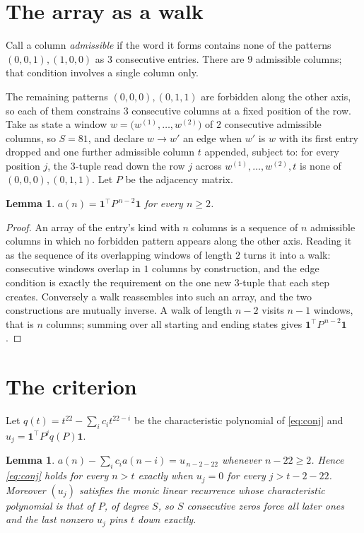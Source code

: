 \documentclass[11pt,a4paper]{article}
\theoremstyle{plain}
\newtheorem{lemma}[theorem]{Lemma}
\theoremstyle{definition}
\begin{document}
\section{The array as a walk}

Call a column \emph{admissible} if the word it forms contains none of the patterns
$(0,0,1), (1,0,0)$ as $3$ consecutive entries. There are $9$ admissible columns; that condition
involves a single column only.

The remaining patterns $(0,0,0), (0,1,1)$ are forbidden along the other axis, so each of them
constrains $3$ consecutive columns at a fixed position of the row. Take as state a
window $w=\bigl(w^{(1)},\dots,w^{(2)}\bigr)$ of $2$ consecutive admissible
columns, so $S=81$, and declare $w\to w'$ an edge when $w'$ is $w$ with its first entry
dropped and one further admissible column $t$ appended, subject to: for every position
$j$, the $3$-tuple read down the row $j$ across $w^{(1)},\dots,w^{(2)},t$
is none of $(0,0,0), (0,1,1)$. Let $P$ be the adjacency matrix.

\begin{lemma}\label{lem:walk}
$a(n)=\mathbf{1}^{\!\top}P^{\,n-2}\mathbf{1}$ for every $n\ge2$.
\end{lemma}

\begin{proof}
An array of the entry's kind with $n$ columns is a sequence of $n$ admissible columns in
which no forbidden pattern appears along the other axis. Reading it as the sequence of its
overlapping windows of length $2$ turns it into a walk: consecutive windows overlap in
$1$ columns by construction, and the edge condition is exactly the requirement on the one
new $3$-tuple that each step creates. Conversely a walk reassembles into such an array,
and the two constructions are mutually inverse. A walk of length $n-2$ visits $n-1$
windows, that is $n$ columns; summing over all starting and ending states gives
$\mathbf{1}^{\!\top}P^{\,n-2}\mathbf{1}$.
\end{proof}

\section{The criterion}

Let $q(t)=t^{22}-\sum_i c_i t^{22-i}$ be the characteristic polynomial of
\eqref{eq:conj} and $u_j=\mathbf{1}^{\!\top}P^{j}q(P)\mathbf{1}$.

\begin{lemma}\label{lem:crit}
$a(n)-\sum_i c_i a(n-i)=u_{\,n-2-22}$ whenever $n-22\ge2$. Hence
\eqref{eq:conj} holds for every $n>t$ exactly when $u_j=0$ for every
$j>t-2-22$. Moreover $(u_j)$ satisfies the monic linear recurrence whose
characteristic polynomial is that of $P$, of degree $S$, so $S$ consecutive zeros force all
later ones and the last nonzero $u_j$ pins $t$ down exactly.
\end{lemma}
\end{document}
